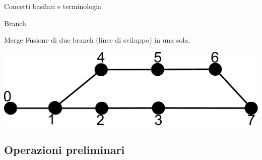 \documentclass[presentation]{beamer}
\begin{document}
\begin{frame}[allowframebreaks]{Concetti basilari e terminologia}
\begin{block}{Branch}
\begin{center}
		\end{center}
	\end{block}
	\begin{block}{Merge}
		Fusione di due branch (linee di sviluppo) in una sola.
		\begin{center}
			\includegraphics[width=.99\textwidth]{img/merge}
		\end{center}
	\end{block}
\end{frame}

\subsection{Operazioni preliminari}
\end{document}
